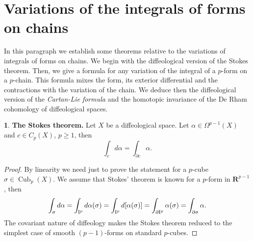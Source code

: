 \documentclass[11pt,reqno]{amsart}
\theoremstyle{definition}
\newtheorem{article}{}
\newcommand{\artlabel}[1]{{\bf #1.}}
\newcommand{\RR}{{\mathbf R}}
\def \X{{X}}
\newcommand{\cub}[1]{{\rm I}^{#1}}
\newcommand{\DCubes}[1]{\operatorname{Cub}_{#1}}
\newcommand{\DChains}[1]{C_{#1}}
\begin{document}
  \section{Variations of the integrals of forms on chains}
  \label{Section-Variation-of-integrals}
  
  \begin{text}
    In this paragraph we establish some theorems
    relative to the variations of integrals of forms on
    chains. We begin with the diffeological version of the
    Stokes theorem. Then, we give a formula for any variation
    of the integral of a $p$-form on a $p$-chain. This
    formula mixes the form, its exterior differential and
    the contractions with the variation of the chain. We
    deduce then the diffeological version of the 
    {\em Cartan-Lie formula} and the homotopic invariance of
    the De Rham cohomology of diffeological spaces.
  \end{text}
  
  \begin{article}\artlabel{The Stokes theorem} 
    \label{The-Stokes-theorem}
    Let $\X$ be a diffeological space. Let
    $\alpha \in \Omega^{p-1}(\X)$ and $c \in
      \DChains{p}(\X)$, $p\geq 1$, then
    $$
      \int_c d\alpha = \int_{\partial c} \alpha.
      $$
  \end{article} %
  
  \begin{proof}
    By linearity we need just to prove the statement for a $p$-cube
    $\sigma \in \DCubes{p}(\X)$. We assume that Stokes' theorem is known for a 
    $p$-form in $\RR^{p-1}$, then
    $$
      \int_\sigma d\alpha = \int_{\cub{p}} d\alpha (\sigma) 
      = \int_{\cub{p}} d[\alpha (\sigma)]
      = \int_{\partial \cub{p}} \alpha (\sigma)
      = \int_{\partial \sigma} \alpha. 
      $$
    The covariant nature of diffeology makes the
    Stokes theorem reduced to the simplest case of smooth
    $(p-1)$-forms on standard $p$-cubes.
  \end{proof}
  
\end{document}
